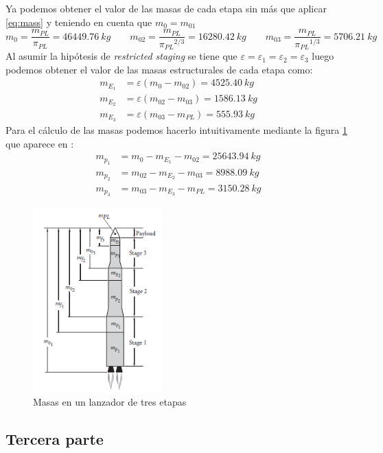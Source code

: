 \documentclass{article}
\begin{document}
Ya podemos obtener el valor de las masas de cada etapa sin más que aplicar \ref{eq:mass} y teniendo en cuenta que $m_{0}=m_{01}$
\[m_{0}=\frac{m_{PL}}{{\pi_{PL}}}=\qty{46449.76}{kg}  \qquad
m_{02}=\frac{m_{PL}}{{\pi_{PL}}^{2/3}}=\qty{16280.42}{kg} \qquad
m_{03}=\frac{m_{PL}}{{\pi_{PL}}^{1/3}}=\qty{5706.21}{kg}\]
\newpage
Al asumir la hipótesis de \textit{restricted staging} se tiene que $\varepsilon=\varepsilon_{1}=\varepsilon_{2}=\varepsilon_{3}$ luego podemos obtener el valor de las masas estructurales de cada etapa como:
\begin{align*}
    m_{E_1} &= \varepsilon(m_{0}-m_{02})= \qty{4525.40}{kg} \\
    m_{E_2} &= \varepsilon(m_{02}-m_{03}) = \qty{1586.13}{kg}  \\
    m_{E_3} &= \varepsilon(m_{03}-m_{PL}) = \qty{555.93}{kg} 
\end{align*}
Para el cálculo de las masas podemos hacerlo intuitivamente mediante la figura \ref{fig:1} que aparece en \cite{curtis}:
\begin{align*}
    m_{p_1} &= m_{0}-m_{E_1}-m_{02} = \qty{25643.94}{kg} \\
    m_{p_2} &= m_{02}-m_{E_2}-m_{03} = \qty{8988.09}{kg}  \\
    m_{p_3} &= m_{03}-m_{E_3}-m_{PL} = \qty{3150.28}{kg}
\end{align*}

\begin{figure}
    \centering
    \includegraphics[width=5cm]{imagenes/3etapas.png}
    \caption{Masas en un lanzador de tres etapas}
    \label{fig:1}
\end{figure}
       

\subsection{Tercera parte}
\end{document}
